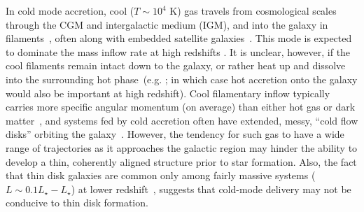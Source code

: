 \documentclass[fleqn,usenatbib]{mnras}
\begin{document}
In cold mode accretion, cool ($T \sim 10^4$ K) gas travels from cosmological scales through the CGM and intergalactic medium (IGM), and into the galaxy in filaments~\cite[e.g.][]{Keres2005, Keres2009, Dekel2006, Faucher-Giguere2011a, Martin2019a}, often along with embedded satellite galaxies~\citep[e.g.][]{Faucher-Giguere2015, Faucher-Giguere2016, Hafen2019, Esmerian2021}.
This mode is expected to dominate the mass inflow rate at high redshifts \citep[$z\gtrsim2$; e.g.][]{Keres2009a, Dekel2009, Huscher2021}.
It is unclear, however, if the cool filaments remain intact down to the galaxy, or rather heat up and dissolve into the surrounding hot phase~(e.g. \citealt{Keres2009b, Nelson2016, Mandelker2016, Mandelker2018, Mandelker2020a}; in which case hot accretion onto the galaxy would also be important at high redshift).
Cool filamentary inflow typically carries more specific angular momentum (on average) than either hot gas or dark matter~\citep[e.g.][]{Stewart2017}, and systems fed by cold accretion often have extended, messy, ``cold flow disks'' orbiting the galaxy~\citep[e.g.][]{Stewart2011a, Stewart2013, Danovich2015, Dekel2019}.
However, the tendency for such gas to have a wide range of trajectories as it approaches the galactic region may hinder the ability to develop a thin, coherently aligned structure prior to star formation.
Also, the fact that thin disk galaxies are common only among fairly massive systems ($L \sim 0.1 L_\star - L_\star$) at lower redshift~\citep[e.g.][]{Kranz2003, Kassin2006, Bizyaev2021, Kassin2012a, Simons2015, Simons2017}, suggests that cold-mode delivery may not be conducive to thin disk formation.
\end{document}
